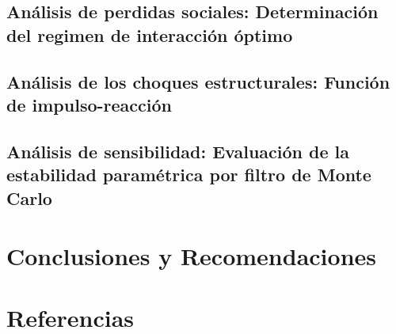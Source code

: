 \documentclass[
  authoryear,
  review]{elsarticle}
\begin{document}
\subsection{Análisis de perdidas sociales: Determinación del regimen de
interacción
óptimo}\label{anuxe1lisis-de-perdidas-sociales-determinaciuxf3n-del-regimen-de-interacciuxf3n-uxf3ptimo}

\subsection{Análisis de los choques estructurales: Función de
impulso-reacción}\label{anuxe1lisis-de-los-choques-estructurales-funciuxf3n-de-impulso-reacciuxf3n}

\subsection{Análisis de sensibilidad: Evaluación de la estabilidad
paramétrica por filtro de Monte
Carlo}\label{anuxe1lisis-de-sensibilidad-evaluaciuxf3n-de-la-estabilidad-paramuxe9trica-por-filtro-de-monte-carlo}

\section{Conclusiones y
Recomendaciones}\label{conclusiones-y-recomendaciones}

\section{Referencias}\label{referencias}

\renewcommand{\bibsection}{}

\end{document}
